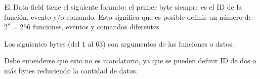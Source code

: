 El Data field tiene el siguiente formato: el primer byte siempre es el ID de la
función, evento y/o comando. Esto significa que es posible definir un número de
$2^8 = 256$ funciones, eventos y comandos diferentes.

Los siguientes bytes (del 1 al 63) son argumentos de las funciones o datos.

Debe entenderse que esto no es mandatorio, ya que se pueden definir ID de
dos o más bytes reduciendo la cantidad de datos. 
